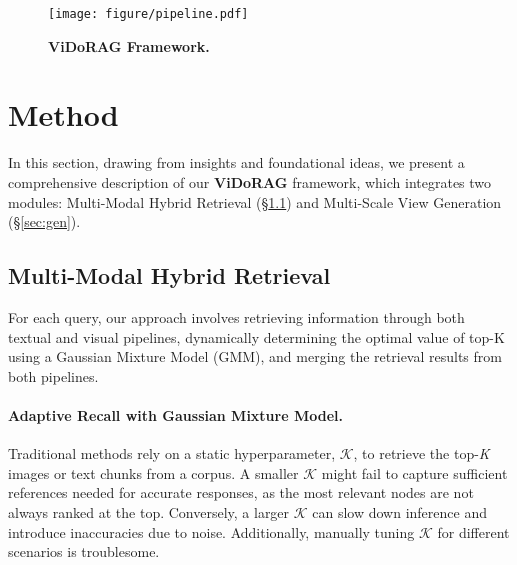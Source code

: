 \begin{figure*}[!t]
    \centering 
    \texttt{[image: figure/pipeline.pdf]}
    \caption{\textbf{ViDoRAG Framework.}}
    \label{fig:pipeline}
\end{figure*}

\section{Method}
In this section, drawing from insights and foundational ideas, we present a comprehensive description of our \textbf{ViDoRAG} framework, which integrates two modules: Multi-Modal Hybrid Retrieval (\S \ref{sec:ret}) and Multi-Scale View Generation (\S \ref{sec:gen}).

\subsection{Multi-Modal Hybrid Retrieval}
\label{sec:ret}
For each query, our approach involves retrieving information through both textual and visual pipelines, dynamically determining the optimal value of top-K using a Gaussian Mixture Model (GMM), and merging the retrieval results from both pipelines.
\paragraph{Adaptive Recall with Gaussian Mixture Model.}
Traditional methods rely on a static hyperparameter, $\mathcal{K}$, to retrieve the top-\textit{K} images or text chunks from a corpus. A smaller $\mathcal{K}$ might fail to capture sufficient references needed for accurate responses, as the most relevant nodes are not always ranked at the top. Conversely, a larger $\mathcal{K}$ can slow down inference and introduce inaccuracies due to noise. Additionally, manually tuning $\mathcal{K}$ for different scenarios is troublesome.

